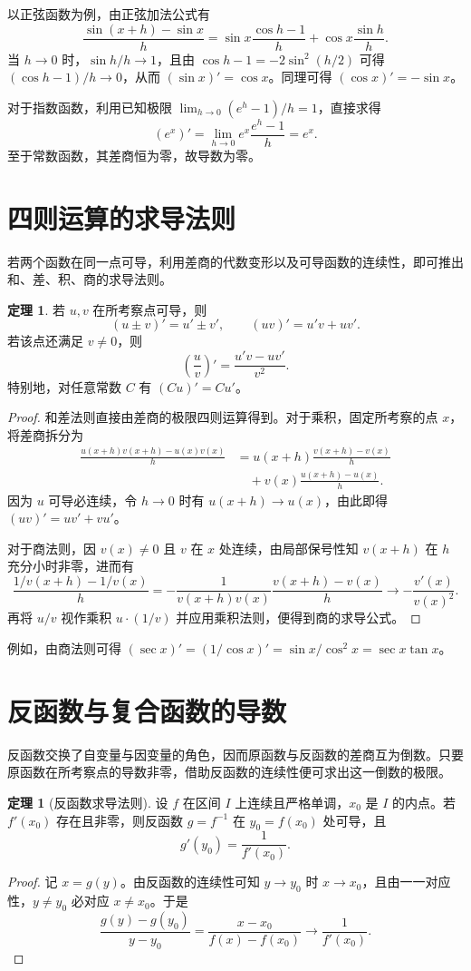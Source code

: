 \documentclass[UTF8,fontset=fandol,a4paper,12pt]{ctexart}
\theoremstyle{definition}
\newtheorem{theorem}[definition]{定理}
\begin{document}
以正弦函数为例，由正弦加法公式有
\[
 \frac{\sin(x+h)-\sin x}{h}
 =\sin x\frac{\cos h-1}{h}+\cos x\frac{\sin h}{h}.
\]
当 $h\to0$ 时，$\sin h/h\to1$，且由 $\cos h-1=-2\sin^2(h/2)$ 可得 $(\cos h-1)/h\to0$，从而 $(\sin x)'=\cos x$。同理可得 $(\cos x)'=-\sin x$。

对于指数函数，利用已知极限 $\lim_{h\to0}(e^h-1)/h=1$，直接求得
\[
 (e^x)'=\lim_{h\to0}e^x\frac{e^h-1}{h}=e^x.
\]
至于常数函数，其差商恒为零，故导数为零。

\section{四则运算的求导法则}
若两个函数在同一点可导，利用差商的代数变形以及可导函数的连续性，即可推出和、差、积、商的求导法则。

\begin{theorem}
若 $u,v$ 在所考察点可导，则
\[
 (u\pm v)'=u'\pm v',\qquad (uv)'=u'v+uv'.
\]
若该点还满足 $v\ne0$，则
\[
 \left(\frac uv\right)'=\frac{u'v-uv'}{v^2}.
\]
特别地，对任意常数 $C$ 有 $(Cu)'=Cu'$。
\end{theorem}
\begin{proof}
和差法则直接由差商的极限四则运算得到。对于乘积，固定所考察的点 $x$，将差商拆分为
\begin{align*}
 \frac{u(x+h)v(x+h)-u(x)v(x)}h
 &=u(x+h)\frac{v(x+h)-v(x)}h\\
 &\quad+v(x)\frac{u(x+h)-u(x)}h.
\end{align*}
因为 $u$ 可导必连续，令 $h\to0$ 时有 $u(x+h)\to u(x)$，由此即得 $(uv)'=uv'+vu'$。

对于商法则，因 $v(x)\ne0$ 且 $v$ 在 $x$ 处连续，由局部保号性知 $v(x+h)$ 在 $h$ 充分小时非零，进而有
\[
 \frac{1/v(x+h)-1/v(x)}h
 =-\frac1{v(x+h)v(x)}\frac{v(x+h)-v(x)}h
 \longrightarrow-\frac{v'(x)}{v(x)^2}.
\]
再将 $u/v$ 视作乘积 $u\cdot(1/v)$ 并应用乘积法则，便得到商的求导公式。
\end{proof}

例如，由商法则可得 $(\sec x)'=(1/\cos x)'=\sin x/\cos^2x=\sec x\tan x$。

\section{反函数与复合函数的导数}
反函数交换了自变量与因变量的角色，因而原函数与反函数的差商互为倒数。只要原函数在所考察点的导数非零，借助反函数的连续性便可求出这一倒数的极限。

\begin{theorem}[反函数求导法则]
设 $f$ 在区间 $I$ 上连续且严格单调，$x_0$ 是 $I$ 的内点。若 $f'(x_0)$ 存在且非零，则反函数 $g=f^{-1}$ 在 $y_0=f(x_0)$ 处可导，且
\[
 \boxed{g'(y_0)=\frac1{f'(x_0)}.}
\]
\end{theorem}
\begin{proof}
记 $x=g(y)$。由反函数的连续性可知 $y\to y_0$ 时 $x\to x_0$，且由一一对应性，$y\ne y_0$ 必对应 $x\ne x_0$。于是
\[
 \frac{g(y)-g(y_0)}{y-y_0}
 =\frac{x-x_0}{f(x)-f(x_0)}
 \longrightarrow\frac1{f'(x_0)}.
\]
\end{proof}
\end{document}
